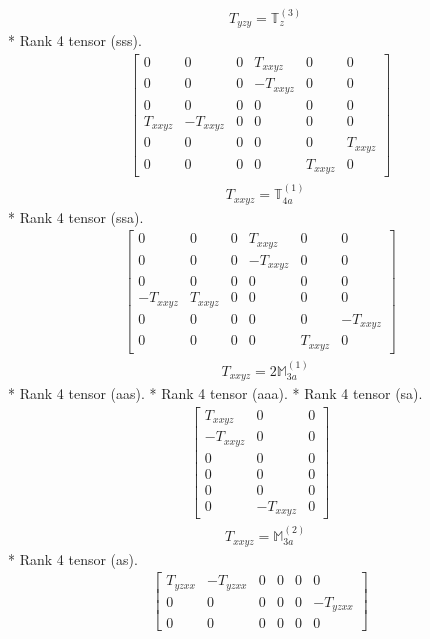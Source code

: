 \documentclass[fleqn,8pt,landscape]{jsarticle}
\begin{document}
\begin{align*}
& T_{yzy} = \mathbb{T}_{z}^{(3)}
\end{align*}
* Rank 4 tensor (sss).
\begin{align*}
\begin{bmatrix} 0 & 0 & 0 & T_{xxyz} & 0 & 0 \\ 0 & 0 & 0 & - T_{xxyz} & 0 & 0 \\ 0 & 0 & 0 & 0 & 0 & 0 \\ T_{xxyz} & - T_{xxyz} & 0 & 0 & 0 & 0 \\ 0 & 0 & 0 & 0 & 0 & T_{xxyz} \\ 0 & 0 & 0 & 0 & T_{xxyz} & 0 \end{bmatrix}
\end{align*}
\begin{align*}
& T_{xxyz} = \mathbb{T}_{4a}^{(1)}
\end{align*}
* Rank 4 tensor (ssa).
\begin{align*}
\begin{bmatrix} 0 & 0 & 0 & T_{xxyz} & 0 & 0 \\ 0 & 0 & 0 & - T_{xxyz} & 0 & 0 \\ 0 & 0 & 0 & 0 & 0 & 0 \\ - T_{xxyz} & T_{xxyz} & 0 & 0 & 0 & 0 \\ 0 & 0 & 0 & 0 & 0 & - T_{xxyz} \\ 0 & 0 & 0 & 0 & T_{xxyz} & 0 \end{bmatrix}
\end{align*}
\begin{align*}
& T_{xxyz} = 2 \mathbb{M}_{3a}^{(1)}
\end{align*}
* Rank 4 tensor (aas).
* Rank 4 tensor (aaa).
* Rank 4 tensor (sa).
\begin{align*}
\begin{bmatrix} T_{xxyz} & 0 & 0 \\ - T_{xxyz} & 0 & 0 \\ 0 & 0 & 0 \\ 0 & 0 & 0 \\ 0 & 0 & 0 \\ 0 & - T_{xxyz} & 0 \end{bmatrix}
\end{align*}
\begin{align*}
& T_{xxyz} = \mathbb{M}_{3a}^{(2)}
\end{align*}
* Rank 4 tensor (as).
\begin{align*}
\begin{bmatrix} T_{yzxx} & - T_{yzxx} & 0 & 0 & 0 & 0 \\ 0 & 0 & 0 & 0 & 0 & - T_{yzxx} \\ 0 & 0 & 0 & 0 & 0 & 0 \end{bmatrix}
\end{align*}
\end{document}
